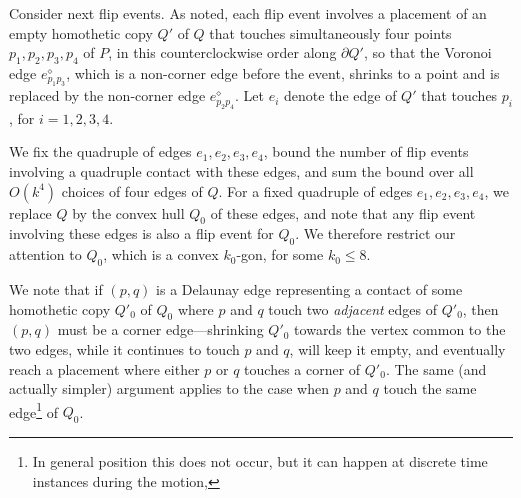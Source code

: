 \documentclass[letter,11pt]{article}
\def\poly{\diamond}
\begin{document}
Consider next flip events. As noted, each flip event involves a 
placement of an empty homothetic copy $Q'$ of $Q$ that touches 
simultaneously four points $p_1,p_2,p_3,p_4$ of $P$, in this 
counterclockwise order along $\partial Q'$, so that the 
Voronoi edge $e_{p_1p_3}^\poly$,
which is a non-corner edge before the event, shrinks to a point
and is replaced by the non-corner edge $e_{p_2p_4}^\poly$. Let $e_i$
denote the edge of $Q'$ that touches $p_i$, for $i=1,2,3,4$. 

We fix the quadruple of edges $e_1,e_2,e_3,e_4$, bound the number
of flip events involving a quadruple contact with these edges,
and sum the bound over all $O(k^4)$ choices of four edges of $Q$.
For a fixed quadruple of edges $e_1,e_2,e_3,e_4$, we replace $Q$ by
the convex hull $Q_0$ of these edges, and note that any flip event
involving these edges is also a flip event
for $Q_0$. We therefore restrict our attention to $Q_0$, which is
a convex $k_0$-gon, for some $k_0\le 8$.

We note that if $(p,q)$ is a Delaunay edge
representing a contact of some homothetic copy $Q'_0$ of $Q_0$ where $p$ and $q$
touch two {\em adjacent} edges of $Q'_0$, then $(p,q)$ must be a corner
edge---shrinking $Q'_0$ towards the vertex common to the two edges,
while it continues to touch $p$ and $q$, will keep it empty, and
eventually reach a placement where either $p$ or $q$ touches a corner
of $Q'_0$.
The same (and actually simpler) argument applies to the case when $p$ and $q$ touch the same edge\footnote{In general position this does not occur, but it can happen at discrete time instances during the motion,} of $Q_0$.
\end{document}
